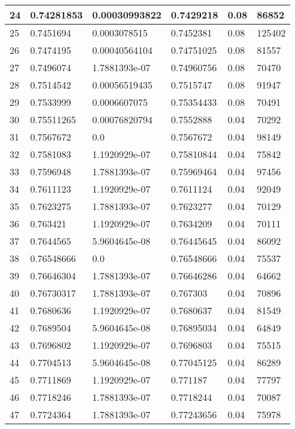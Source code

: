 \begin{longtable}{|l|l|l|l|l|l|}
24 & 0.74281853 & 0.00030993822 & 0.7429218 & 0.08 & 86852 \\ \hline 
25 & 0.7451694 & 0.0003078515 & 0.7452381 & 0.08 & 125402 \\ \hline 
26 & 0.7474195 & 0.00040564104 & 0.74751025 & 0.08 & 81557 \\ \hline 
27 & 0.7496074 & 1.7881393e-07 & 0.74960756 & 0.08 & 70470 \\ \hline 
28 & 0.7514542 & 0.00056519435 & 0.7515747 & 0.08 & 91947 \\ \hline 
29 & 0.7533999 & 0.0006607075 & 0.75354433 & 0.08 & 70491 \\ \hline 
30 & 0.75511265 & 0.00076820794 & 0.7552888 & 0.04 & 70292 \\ \hline 
31 & 0.7567672 & 0.0 & 0.7567672 & 0.04 & 98149 \\ \hline 
32 & 0.7581083 & 1.1920929e-07 & 0.75810844 & 0.04 & 75842 \\ \hline 
33 & 0.7596948 & 1.7881393e-07 & 0.75969464 & 0.04 & 97456 \\ \hline 
34 & 0.7611123 & 1.1920929e-07 & 0.7611124 & 0.04 & 92049 \\ \hline 
35 & 0.7623275 & 1.7881393e-07 & 0.7623277 & 0.04 & 70129 \\ \hline 
36 & 0.763421 & 1.1920929e-07 & 0.7634209 & 0.04 & 70111 \\ \hline 
37 & 0.7644565 & 5.9604645e-08 & 0.76445645 & 0.04 & 86092 \\ \hline 
38 & 0.76548666 & 0.0 & 0.76548666 & 0.04 & 75537 \\ \hline 
39 & 0.76646304 & 1.7881393e-07 & 0.76646286 & 0.04 & 64662 \\ \hline 
40 & 0.76730317 & 1.7881393e-07 & 0.767303 & 0.04 & 70896 \\ \hline 
41 & 0.7680636 & 1.1920929e-07 & 0.7680637 & 0.04 & 81549 \\ \hline 
42 & 0.7689504 & 5.9604645e-08 & 0.76895034 & 0.04 & 64849 \\ \hline 
43 & 0.7696802 & 1.1920929e-07 & 0.7696803 & 0.04 & 75515 \\ \hline 
44 & 0.7704513 & 5.9604645e-08 & 0.77045125 & 0.04 & 86289 \\ \hline 
45 & 0.7711869 & 1.1920929e-07 & 0.771187 & 0.04 & 77797 \\ \hline 
46 & 0.7718246 & 1.7881393e-07 & 0.7718244 & 0.04 & 70087 \\ \hline 
47 & 0.7724364 & 1.7881393e-07 & 0.77243656 & 0.04 & 75978 \\ \hline 

\end{longtable}
